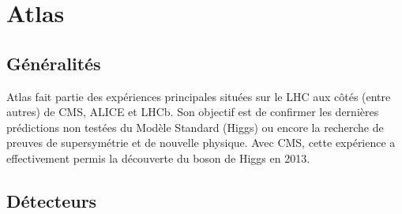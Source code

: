 \documentclass[11pt]{article} %
\begin{document}
%




\section{Atlas}

\subsection{Généralités}

Atlas fait partie des expériences principales situées sur le LHC aux côtés (entre autres) de CMS, ALICE et LHCb. Son objectif est de confirmer les dernières prédictions non testées du Modèle Standard (Higgs) ou encore la recherche de preuves de supersymétrie et de nouvelle physique. Avec CMS, cette expérience a effectivement permis la découverte du boson de Higgs en 2013.

\subsection{Détecteurs}
\end{document}
